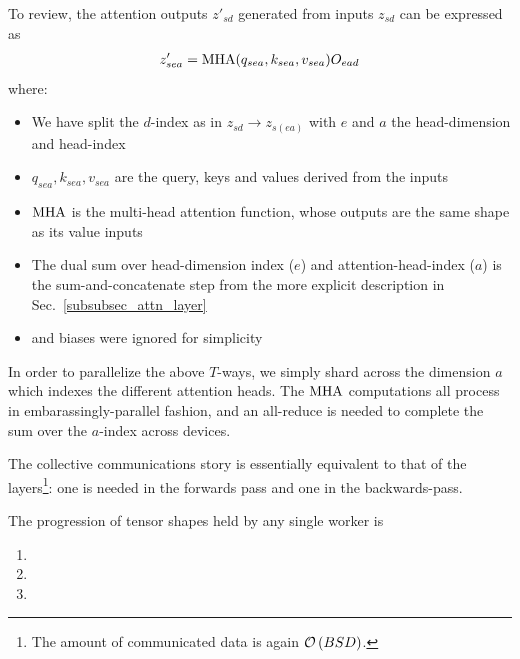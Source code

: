 To review, the attention outputs $ z' _{ sd } $ generated from inputs $ z_{ sd } $ can be expressed
as
\begin{align}
    z' _{ sea }  &= {\rm  MHA}(q _{ sea }, k _{ sea }, v _{ sea }) O _{ ead }\nonumber\\
\end{align}
where:
\begin{itemize}
    \item  We have split the $ d $-index as in $ z _{ sd }\longrightarrow z _{ s (ea) } $ with $ e $ and
$ a $ the head-dimension and head-index
    \item $ q _{ sea }, k _{ sea }, v _{ sea }
$ are the query, keys and values derived from the inputs
    \item ${\rm
    MHA } $ is the multi-head attention function, whose outputs are the same shape as its value inputs
    \item The dual sum over head-dimension index ($ e $) and attention-head-index ($ a $) is the
    sum-and-concatenate step from the more explicit description in Sec.~\ref{subsubsec_attn_layer}
    \item {} and biases were ignored for simplicity
\end{itemize}

In order to parallelize the above $ T $-ways, we simply shard across the dimension $ a $  which
indexes the different attention heads.  The $ {\rm MHA} $ computations all process in
embarassingly-parallel fashion, and an all-reduce is needed to complete the sum over the $ a $-index
across devices.

The collective communications story is essentially
equivalent to that of the  layers\footnote{The amount of communicated data is again $ \mathcal{O} \left( BSD
\right)$. }: one  is needed in the forwards pass
and one  in the backwards-pass.

The progression of tensor shapes held by any single worker is
\begin{enumerate}
    \item {}
    \item {}
    \item {}
\end{enumerate}


